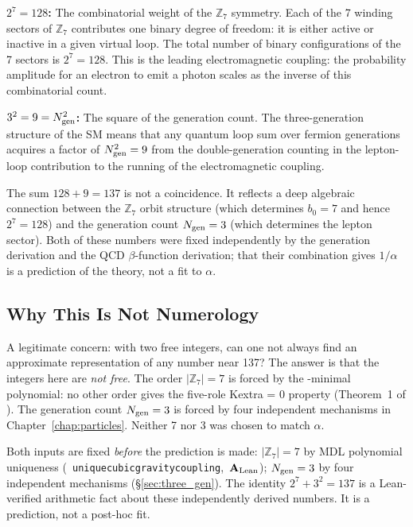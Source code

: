 \documentclass[11pt,openany]{book}
\theoremstyle{remark}
\newcommand{\MDL}{\text{MDL}}
\newcommand{\ZS}{\mathbb{Z}_7}
\newcommand{\lean}[1]{%
  \penalty-100
  \begingroup\def\_{\textunderscore\allowbreak}\texttt{#1}\endgroup}
\newcommand{\Ngen}{N_{\rm gen}}
\newcommand{\CatAL}{\ensuremath{\textbf{A}_{\rm Lean}}}
\begin{document}
\textbf{$2^7 = 128$:} The combinatorial weight of the $\ZS$ symmetry.  Each of the
7 winding sectors of $\ZS$ contributes one binary degree of freedom: it is either active
or inactive in a given virtual loop.  The total number of binary configurations of the 7
sectors is $2^7 = 128$.  This is the leading electromagnetic coupling: the probability
amplitude for an electron to emit a photon scales as the inverse of this combinatorial
count.

\textbf{$3^2 = 9 = \Ngen^2$:} The square of the generation count.  The three-generation
structure of the SM means that any quantum loop sum over fermion generations acquires
a factor of $\Ngen^2 = 9$ from the double-generation counting in the lepton-loop
contribution to the running of the electromagnetic coupling.

The sum $128 + 9 = 137$ is not a coincidence.  It reflects a deep algebraic connection
between the $\ZS$ orbit structure (which determines $b_0 = 7$ and hence $2^7 = 128$)
and the generation count $\Ngen = 3$ (which determines the lepton sector).  Both of
these numbers were fixed independently by the generation derivation and the QCD
$\beta$-function derivation; that their combination gives $1/\alpha$ is a prediction of
the theory, not a fit to $\alpha$.

\subsection*{Why This Is Not Numerology}

A legitimate concern: with two free integers, can one not always find an approximate
representation of any number near 137?  The answer is that the integers here are
\emph{not free}.  The order $|\ZS| = 7$ is forced by the \MDL-minimal polynomial:
no other order gives the five-role K\mbox{extra} = 0 property
(Theorem~1 of \cite{SpivackGTEPolynomialUFT}).  The generation count $\Ngen = 3$ is
forced by four independent mechanisms in Chapter~\ref{chap:particles}.  Neither 7 nor 3
was chosen to match $\alpha$.

\begin{tcolorbox}[colback=yellow!8,colframe=yellow!60!black,title={Why This Is Not Numerology}]
Both inputs are fixed \emph{before} the prediction is made: $|\ZS| = 7$ by MDL
polynomial uniqueness \mbox{(\lean{unique\_cubic\_gravity\_coupling}, \CatAL{})}; $\Ngen = 3$ by
four independent mechanisms (\S\ref{sec:three_gen}).  The identity $2^7 + 3^2 = 137$ is
a Lean-verified arithmetic fact about these independently derived numbers.  It is
a prediction, not a post-hoc fit.
\end{tcolorbox}
\end{document}
